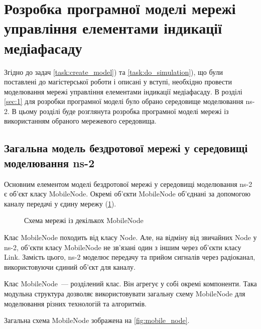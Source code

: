 \documentclass[a4paper,ukrainian,utf8,nocolumnsxix,floatsection,equationsection]{eskdtext}
\begin{document}



\section{Розробка програмної моделі мережі управління елементами індикації медіафасаду}
\label{sec:3:model:development}

Згідно до задач \ref{task:create_model}) та \ref{task:do_simulation}), що були поставлені до магістерської роботи і описані у вступі, необхідно провести моделювання мережі управління елементами індикації медіафасаду. В розділі \ref{sec:1} для розробки програмної моделі було обрано середовище моделювання ns-2. В цьому розділі буде розглянута розробка програмної моделі мережі із використанням обраного мережевого середовища.

\subsection{Загальна модель бездротової мережі у середовищі моделювання ns-2}
\label{sub:ns:general:network:model}

Основним елементом моделі бездротової мережі у середовищі моделювання ns-2 є об'єкт класу MobileNode. Окремі об'єкти MobileNode об'єднані за допомогою каналу передачі у єдину мережу (\cref{fig:mobile_node:network}). 


\begin{figure}[bth]
	\centering
	\caption{\label{fig:mobile_node:network}Схема мережі із декількох MobileNode}
\end{figure}

Клас MobileNode походить від класу Node. Але, на відміну від звичайних Node у ns-2, об'єкти класу MobileNode не зв'язані один з іншим через об'єкти класу Link. Замість цього, ns-2 моделює передачу та прийом сигналів через радіоканал, використовуючи єдиний об'єкт для каналу.

Клас MobileNode~--- розділений клас. Він агрегує у собі окремі компоненти. Така модульна структура дозволяє використовувати загальну схему MobileNode для моделювання різних технологій та алгоритмів. 

Загальна схема MobileNode зображена на \cref{fig:mobile_node}.
\end{document}
